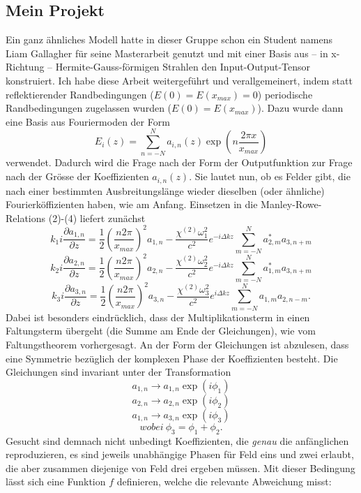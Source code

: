 \documentclass{article}
\begin{document}
\subsection{Mein Projekt}
Ein ganz \"{a}hnliches Modell hatte in dieser Gruppe schon ein Student namens Liam Gallagher f\"{u}r seine Masterarbeit genutzt und mit einer Basis aus -- in x-Richtung -- Hermite-Gauss-f\"{o}rmigen Strahlen den Input-Output-Tensor konstruiert. Ich habe diese Arbeit weitergef\"{u}hrt und verallgemeinert, indem statt reflektierender Randbedingungen ($E(0)=E(x_{max})=0$) periodische Randbedingungen zugelassen wurden  ($E(0)=E(x_{max})$). Dazu wurde dann eine Basis aus Fouriermoden der Form 
$$E_i(z)= \sum_{n=-N}^{N} a_{i,n}(z) \exp(n \frac{2\pi x}{x_{max}})$$
verwendet. Dadurch wird die Frage nach der Form der Outputfunktion zur Frage nach der Gr\"{o}sse der Koeffizienten $a_{i,n}(z)$. Sie lautet nun, ob es Felder gibt, die nach einer bestimmten Ausbreitungsl\"{a}nge wieder dieselben (oder \"{a}hnliche) Fourierk\"{o}ffizienten haben, wie am Anfang. Einsetzen in die Manley-Rowe-Relations (2)-(4) liefert zun\"{a}chst
\begin{equation}
k_1 i\frac{\partial a_{1, n}} {\partial z}=\frac{1}{2}(\frac{n 2 \pi}{x_{max}})^2 a_{1, n}-\frac{\chi^{(2)} \omega_1^2}{c^2}  e^{-i\Delta k z} \sum_{m=-N}^{N} a_{2, m}^* a_{3, n+m}
\end{equation}
\begin{equation}
k_2 i\frac{\partial a_{2, n}} {\partial z}=\frac{1}{2}(\frac{n 2 \pi}{x_{max}})^2 a_{2, n}-\frac{\chi^{(2)} \omega_2^2}{c^2} e^{-i\Delta k z} \sum_{m=-N}^{N} a_{1, m}^* a_{3, n+m} 
\end{equation}
\begin{equation}
k_3 i\frac{\partial a_{3, n}} {\partial z}=\frac{1}{2}(\frac{n 2 \pi}{x_{max}})^2 a_{3, n}-\frac{\chi^{(2)} \omega_3^2}{c^2} e^{i\Delta k z} \sum_{m=-N}^{N} a_{1, m} a_{2, n-m}. 
\end{equation}
Dabei ist besonders eindr\"{u}cklich, dass der Multiplikationsterm in einen Faltungsterm \"{u}bergeht (die Summe am Ende der Gleichungen), wie vom Faltungstheorem vorhergesagt. An der Form der Gleichungen ist abzulesen, dass eine Symmetrie bez\"{u}glich der komplexen Phase der Koeffizienten besteht. Die Gleichungen sind invariant unter der Transformation 
$$a_{1, n} \longrightarrow a_{1, n} \exp(i \phi_1)$$
$$a_{2, n} \longrightarrow a_{2, n} \exp(i \phi_2)$$
$$a_{1, n} \longrightarrow a_{3, n} \exp(i \phi_3)$$
$$wobei \ \phi_3=\phi_1+\phi_2.$$
Gesucht sind demnach nicht unbedingt Koeffizienten, die \emph{genau} die anf\"{a}nglichen reproduzieren, es sind jeweils unabh\"{a}ngige Phasen f\"{u}r Feld eins und zwei erlaubt, die aber zusammen diejenige von Feld drei ergeben m\"{u}ssen. Mit dieser Bedingung l\"{a}sst sich eine Funktion $f$ definieren, welche die relevante Abweichung misst:
\end{document}
